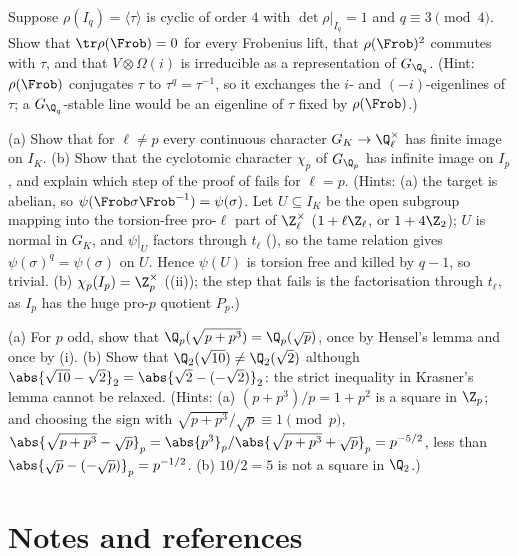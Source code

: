 \begin{exercise}\label{ex:local:ex-order4}
Suppose $\rho(I_q)=\langle\tau\rangle$ is cyclic of order $4$ with $\det\rho|_{I_q}=1$ and $q\equiv3\pmod4$. Show that $\tr\rho(\Frob)=0$ for every Frobenius lift, that $\rho(\Frob)^2$
commutes with $\tau$, and that $V\otimes\Omega(i)$ is irreducible as a representation of $G_{\Q_q}$. (Hint: $\rho(\Frob)$ conjugates $\tau$ to $\tau^q=\tau^{-1}$, so
it exchanges the $i$- and $(-i)$-eigenlines of $\tau$; a $G_{\Q_q}$-stable line would be an eigenline of $\tau$ fixed by $\rho(\Frob)$.)
\end{exercise}

\begin{exercise}\label{ex:local:ex-ell-equals-p}
(a) Show that for $\ell\ne p$ every continuous character $G_K\to\Q_\ell^\times$ has finite image on $I_K$. (b) Show that the cyclotomic character $\chi_p$ of
$G_{\Q_p}$ has infinite image on $I_p$, and explain which step of the proof of  fails for $\ell=p$. (Hints: (a) the target is
abelian, so $\psi(\Frob\sigma\Frob^{-1})=\psi(\sigma)$. Let $U\subseteq I_K$ be the open subgroup mapping into the torsion-free pro-$\ell$ part of $\Z_\ell^\times$
($1+\ell\Z_\ell$, or $1+4\Z_2$); $U$ is normal in $G_K$, and $\psi|_U$ factors through $t_\ell$ (), so the tame relation gives
$\psi(\sigma)^q=\psi(\sigma)$ on $U$. Hence $\psi(U)$ is torsion free and killed by $q-1$, so trivial. (b) $\chi_p(I_p)=\Z_p^\times$ ((ii)); the step that fails is the
factorisation through $t_\ell$, as $I_p$ has the huge pro-$p$ quotient $P_p$.)
\end{exercise}

\begin{exercise}\label{ex:local:ex-krasner}
(a) For $p$ odd, show that $\Q_p(\sqrt{p+p^3})=\Q_p(\sqrt p)$, once by Hensel's lemma and once by (i). (b) Show that $\Q_2(\sqrt{10})\ne\Q_2(\sqrt2)$
although $\abs{\sqrt{10}-\sqrt2}_2=\abs{\sqrt2-(-\sqrt2)}_2$: the strict inequality in Krasner's lemma cannot be relaxed. (Hints: (a) $(p+p^3)/p=1+p^2$ is a square
in $\Z_p$; and choosing the sign with $\sqrt{p+p^3}/\sqrt p\equiv1\pmod p$, $\abs{\sqrt{p+p^3}-\sqrt p}_p=\abs{p^3}_p/\abs{\sqrt{p+p^3}+\sqrt p}_p=p^{-5/2}$,
less than $\abs{\sqrt p-(-\sqrt p)}_p=p^{-1/2}$. (b) $10/2=5$ is not a square in $\Q_2$.)
\end{exercise}

\section{Notes and references}\label{sec:local:notes}


